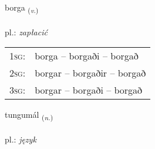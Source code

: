 \documentclass[frontgrid, backgrid]{flacards}\usepackage[]{graphicx}\usepackage[]{xcolor}
\begin{document}
\renewcommand{\flhead}{\vskip5pt \fboxsep=0pt {\small\bfseries\footnotesize Sagnorð | Verb}}
\renewcommand{\fcfoot}{\vskip5pt \fboxsep=0pt \hspace{2pt}{\small\bfseries\footnotesize 1K}}

\renewcommand{\blhead}{\vskip5pt {\small\bfseries\footnotesize Sagnorð | Verb }}
\renewcommand{\bcfoot}{\vskip5pt \hspace{2pt}{\small\bfseries\footnotesize 1K}}


{borga \small{\textsubscript{(\textit{v.})}} \\[1ex] %
\textphonetic{[pɔrka]} \\
pl.: \emph{zapłacić} \\  [2ex]
\renewcommand*{\arraystretch}{0.8}
\begin{tabular}{p{1cm}l}
\textsc{1sg}: & borga -- borgaði -- borgað \\ 
\textsc{2sg}: & borgar -- borgaðir -- borgað \\ 
\textsc{3sg}: & borgar -- borgaði -- borgað \\ 
\end{tabular}
}

\renewcommand{\flhead}{\vskip5pt \fboxsep=0pt {\small\bfseries\footnotesize Nafnorð | Noun}}
\renewcommand{\fcfoot}{\vskip5pt \fboxsep=0pt \hspace{2pt}{\small\bfseries\footnotesize 1K}}

\renewcommand{\blhead}{\vskip5pt {\small\bfseries\footnotesize Nafnorð | Noun }}
\renewcommand{\bcfoot}{\vskip5pt \hspace{2pt}{\small\bfseries\footnotesize 1K}}


{tungumál \small{\textsubscript{(\textit{n.})}} \\[1ex] %
\textphonetic{[tʰuŋkʏmaul]} \\
pl.: \emph{język} \\  [2ex]
\renewcommand*{\arraystretch}{0.8}
}
\end{document}
